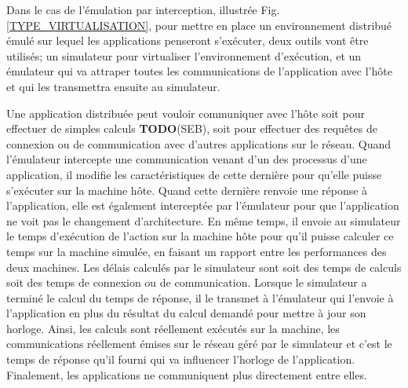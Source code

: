 Dans le cas de l'émulation par interception, illustrée
Fig.\ref{TYPE_VIRTUALISATION}, pour mettre en place un environnement distribué
émulé sur lequel les applications penseront s'exécuter, deux outils vont être
utilisés; un simulateur pour virtualiser l'environnement d'exécution, et un
émulateur qui va attraper toutes les communications de l'application avec l'hôte
et qui les transmettra ensuite au simulateur.

 Une application distribuée peut vouloir communiquer avec l'hôte soit pour
 effectuer de simples calculs {\color{red}\textbf{TODO}}(SEB), soit pour effectuer des requêtes de
 connexion ou de communication avec d'autres applications sur le réseau. Quand
 l'émulateur intercepte une communication venant d'un des processus d'une
 application, il modifie les caractéristiques de cette dernière pour qu'elle
 puisse s'exécuter sur la machine hôte. Quand cette dernière renvoie une réponse
 à l'application, elle est également interceptée par l'émulateur pour que
 l'application ne voit pas le changement d'architecture. En même temps, il
 envoie au simulateur le temps d'exécution de l'action sur la machine hôte pour
 qu'il puisse calculer ce temps sur la machine simulée, en faisant un rapport
 entre les performances des deux machines. Les délais calculés par le simulateur
 sont soit des temps de calculs soit des temps de connexion ou de
 communication. Lorsque le simulateur a terminé le calcul du temps de réponse,
 il le transmet à l'émulateur qui l'envoie à l'application en plus du résultat
 du calcul demandé pour mettre à jour son horloge. Ainsi, les calculs sont
 réellement exécutés sur la machine, les communications réellement émises sur le
 réseau géré par le simulateur et c'est le temps de réponse qu'il fourni qui va
 influencer l'horloge de l'application. Finalement, les applications ne
 communiquent plus directement entre elles.

